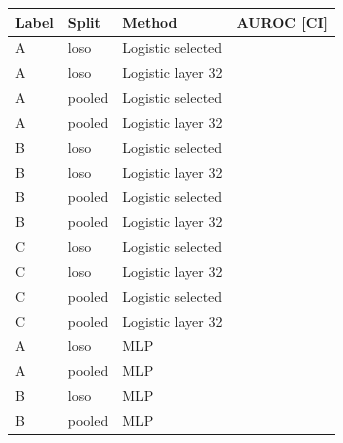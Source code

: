 \begin{tabular}{llll}
\toprule
Label & Split & Method & AUROC [CI] \\
\midrule
A & loso & Logistic selected & \qwenRoundALosoSelected{} \qwenRoundALosoSelectedCI{} \\
A & loso & Logistic layer 32 & \qwenRoundALosoFixed{} \qwenRoundALosoFixedCI{} \\
A & pooled & Logistic selected & \qwenRoundAPooledSelected{} \qwenRoundAPooledSelectedCI{} \\
A & pooled & Logistic layer 32 & \qwenRoundAPooledFixed{} \qwenRoundAPooledFixedCI{} \\
B & loso & Logistic selected & \qwenRoundBLosoSelected{} \qwenRoundBLosoSelectedCI{} \\
B & loso & Logistic layer 32 & \qwenRoundBLosoFixed{} \qwenRoundBLosoFixedCI{} \\
B & pooled & Logistic selected & \qwenRoundBPooledSelected{} \qwenRoundBPooledSelectedCI{} \\
B & pooled & Logistic layer 32 & \qwenRoundBPooledFixed{} \qwenRoundBPooledFixedCI{} \\
C & loso & Logistic selected & \qwenRoundCLosoSelected{} \qwenRoundCLosoSelectedCI{} \\
C & loso & Logistic layer 32 & \qwenRoundCLosoFixed{} \qwenRoundCLosoFixedCI{} \\
C & pooled & Logistic selected & \qwenRoundCPooledSelected{} \qwenRoundCPooledSelectedCI{} \\
C & pooled & Logistic layer 32 & \qwenRoundCPooledFixed{} \qwenRoundCPooledFixedCI{} \\
A & loso & MLP & \qwenRoundMLPALoso{} \qwenRoundMLPALosoCI{} \\
A & pooled & MLP & \qwenRoundMLPAPooled{} \qwenRoundMLPAPooledCI{} \\
B & loso & MLP & \qwenRoundMLPBLoso{} \qwenRoundMLPBLosoCI{} \\
B & pooled & MLP & \qwenRoundMLPBPooled{} \qwenRoundMLPBPooledCI{} \\
\bottomrule
\end{tabular}
